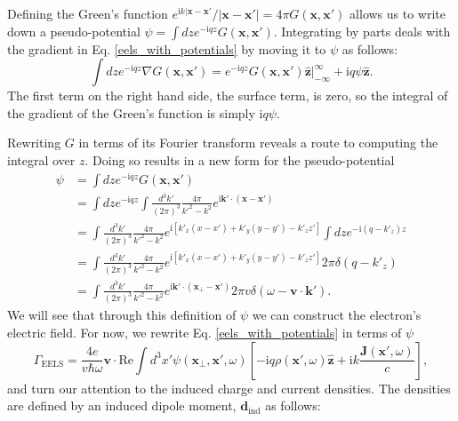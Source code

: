 \documentclass [11pt, proquest] {uwthesis}[2016/11/22]
\begin{document}
Defining the Green's function $e^{\textrm{i}k|\textbf{x}-\textbf{x}'}/|\textbf{x}-\textbf{x}'| = 4\pi G(\textbf{x},\textbf{x}')$ allows us to write down a pseudo-potential $\psi = \int dz e^{-\textrm{i}qz} G(\textbf{x},\textbf{x}')$. Integrating by parts deals with the gradient in Eq. \ref{eels_with_potentials} by moving it to $\psi$ as follows: 
\begin{equation}
\int dz e^{-\textrm{i}qz} \nabla G(\textbf{x},\textbf{x}') = e^{-\textrm{i}qz} G(\textbf{x},\textbf{x}') \hat{\textbf{z}} \Big|_{-\infty}^{\infty} + \textrm{i}q \psi \hat{\textbf{z}}.
\label{psi_integral}
\end{equation}
The first term on the right hand side, the surface term, is zero, so the integral of the gradient of the Green's function is simply $\textrm{i}q\psi$.

Rewriting $G$ in terms of its Fourier transform reveals a route to computing the integral over $z$. Doing so results in a new form for the pseudo-potential
\begin{equation}
\begin{aligned}
\psi &= \int dz e^{-\textrm{i}qz} G(\textbf{x},\textbf{x}')\\ 
&= \int dz e^{-\textrm{i}qz} \int \frac{d^3k'}{(2\pi)^3} \frac{4\pi}{k'^2 - k^2} e^{\textrm{i}\textbf{k}'\cdot(\textbf{x}-\textbf{x}')}\\
&= \int \frac{d^3k'}{(2\pi)^3} \frac{4\pi}{k'^2 - k^2} e^{\textrm{i}[k'_x(x-x')+k'_y(y-y')-k'_zz']} \int dz e^{-\textrm{i}(q-k'_z)z}\\
&= \int \frac{d^3k'}{(2\pi)^3} \frac{4\pi}{k'^2 - k^2} e^{\textrm{i}[k'_x(x-x')+k'_y(y-y')-k'_zz']} 2\pi\delta(q-k'_z)\\
&= \int \frac{d^3k'}{(2\pi)^3} \frac{4\pi}{k'^2 - k^2} e^{\textrm{i}\textbf{k}'\cdot(\textbf{x}_{\perp}-\textbf{x}')} 2\pi v \delta(\omega-\textbf{v}\cdot\textbf{k}').
\label{psi_k_space}
\end{aligned}
\end{equation}
We will see that through this definition of $\psi$ we can construct the electron's electric field. For now, we rewrite Eq. \ref{eels_with_potentials} in terms of $\psi$
\begin{equation}
\Gamma_{\textrm{EELS}} = \frac{4e}{v\hbar\omega}\textbf{v}\cdot\textrm{Re}\int d^3x' \psi(\textbf{x}_{\perp},\textbf{x}',\omega) \left[-\textrm{i}q\rho(\textbf{x}',\omega)\hat{\textbf{z}} + \textrm{i}k\frac{\textbf{J}(\textbf{x}',\omega)}{c}\right],
\label{eels_with_psi}
\end{equation}
and turn our attention to the induced charge and current densities. The densities are defined by an induced dipole moment, $\textbf{d}_{\textrm{ind}}$ as follows:
\end{document}
